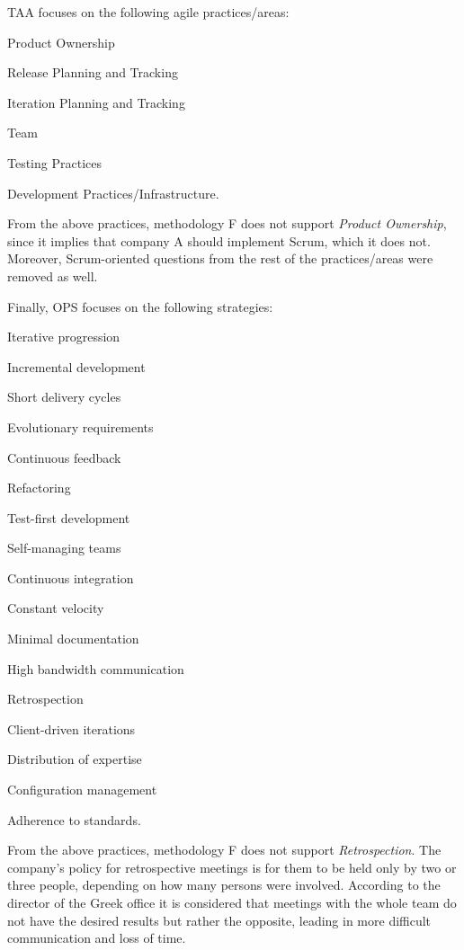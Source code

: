 \ac{TAA} focuses on the following agile practices/areas:
\begin{inparaenum} [a\upshape)]
	\item Product Ownership
	\item Release Planning and Tracking
	\item Iteration Planning and Tracking
	\item Team
	\item Testing Practices
	\item Development Practices/Infrastructure.
\end{inparaenum}
From the above practices, methodology F does not support \textit{Product Ownership}, since it implies that company A should implement Scrum, which it does not. Moreover, Scrum-oriented questions from the rest of the practices/areas were removed as well. 

Finally, \ac{OPS} focuses on the following strategies:
\begin{inparaenum} [a\upshape)]
	\item Iterative progression
	\item Incremental development
	\item Short delivery cycles
	\item Evolutionary requirements
	\item Continuous feedback
	\item Refactoring
	\item Test-first development
	\item Self-managing teams
	\item Continuous integration
	\item Constant velocity
	\item Minimal documentation
	\item High bandwidth communication
	\item Retrospection
	\item Client-driven iterations
	\item Distribution of expertise
	\item Configuration management
	\item Adherence to standards.
\end{inparaenum}

From the above practices, methodology F does not support \textit{Retrospection}. The company's policy for retrospective meetings is for them to be held only by two or three people, depending on how many persons were involved. According to the director of the Greek office it is considered that meetings with the whole team do not have the desired results but rather the opposite, leading in more difficult communication and loss of time.

